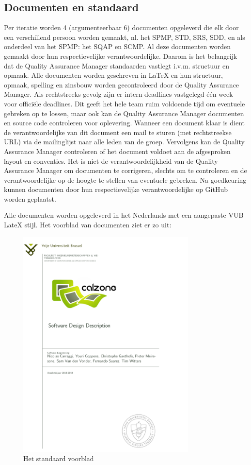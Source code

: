 \subsection{Documenten en standaard}
Per iteratie worden 4 (argumenteerbaar 6) documenten opgeleverd die elk door een verschillend persoon worden gemaakt, nl. het SPMP, STD, SRS, SDD, en als onderdeel van het SPMP: het SQAP en SCMP. Al deze documenten worden gemaakt door hun respectievelijke verantwoordelijke. Daarom is het belangrijk dat de Quality Assurance Manager standaarden vastlegt i.v.m. structuur en opmaak. Alle documenten worden geschreven in LaTeX en hun structuur, opmaak, spelling en zinsbouw worden gecontroleerd door de Quality Assurance Manager. Als rechtstreeks gevolg zijn er intern deadlines vastgelegd één week voor officiële deadlines. Dit geeft het hele team ruim voldoende tijd om eventuele gebreken op te lossen, maar ook kan de Quality Assurance Manager documenten en source code controleren voor oplevering. Wanneer een document klaar is dient de verantwoordelijke van dit document een mail te sturen (met rechtstreekse URL) via de mailinglijst naar alle leden van de groep. Vervolgens kan de Quality Assurance Manager controleren of het document voldoet aan de afgesproken layout en conventies. Het is niet de verantwoordelijkheid van de Quality Assurance Manager om documenten te corrigeren, slechts om te controleren en de verantwoordelijke op de hoogte te stellen van eventuele gebreken. Na goedkeuring kunnen documenten door hun respectievelijke verantwoordelijke op GitHub worden geplaatst.

Alle documenten worden opgeleverd in het Nederlands met een aangepaste VUB LateX stijl\cite{VUBHuisstijl}. Het voorblad van documenten ziet er zo uit:

\begin{figure}[ht!]
\centering
\includegraphics[width=90mm]{SupportingProcessPlans/voorblad.png}
\caption{Het standaard voorblad}
\label{overflow}
\end{figure}

